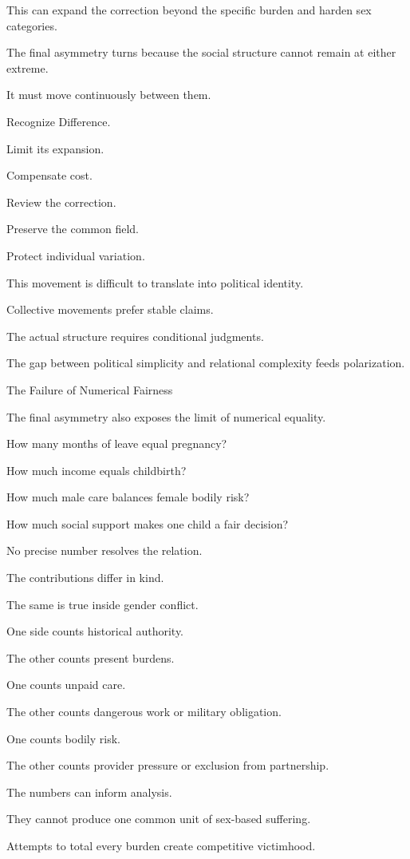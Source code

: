 This can expand the correction beyond the specific burden and harden sex categories.

The final asymmetry turns because the social structure cannot remain at either extreme.

It must move continuously between them.

Recognize Difference.

Limit its expansion.

Compensate cost.

Review the correction.

Preserve the common field.

Protect individual variation.

This movement is difficult to translate into political identity.

Collective movements prefer stable claims.

The actual structure requires conditional judgments.

The gap between political simplicity and relational complexity feeds polarization.

The Failure of Numerical Fairness

The final asymmetry also exposes the limit of numerical equality.

How many months of leave equal pregnancy?

How much income equals childbirth?

How much male care balances female bodily risk?

How much social support makes one child a fair decision?

No precise number resolves the relation.

The contributions differ in kind.

The same is true inside gender conflict.

One side counts historical authority.

The other counts present burdens.

One counts unpaid care.

The other counts dangerous work or military obligation.

One counts bodily risk.

The other counts provider pressure or exclusion from partnership.

The numbers can inform analysis.

They cannot produce one common unit of sex-based suffering.

Attempts to total every burden create competitive victimhood.

